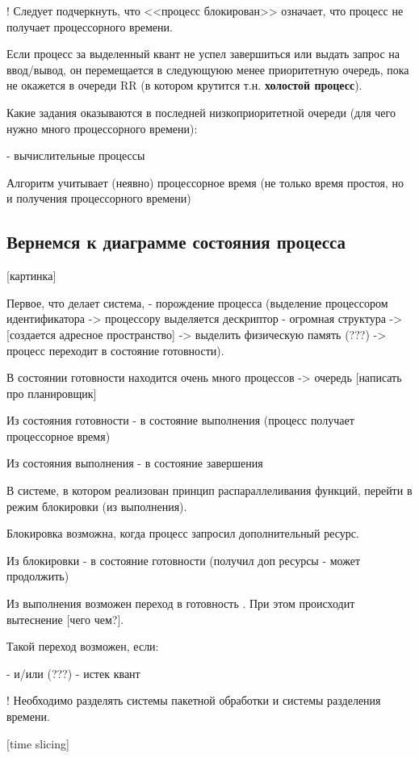 \documentclass[14pt, a4paper]{article}
\begin{document}
	! Следует подчеркнуть, что <<процесс блокирован>> означает, что процесс не получает процессорного времени.
	
	Если процесс за выделенный квант не успел завершиться или выдать запрос на ввод/вывод, он перемещается в следующуюю менее приоритетную очередь, пока не окажется в очереди RR (в котором крутится т.н. {\bf холостой процесс}).
	
	Какие задания оказываются в последней низкоприоритетной очереди (для чего нужно много процессорного времени):
	
	- вычислительные процессы
	
	Алгоритм учитывает (неявно) процессорное время (не только время простоя, но и получения процессорного времени)
	
	\subsection{Вернемся к диаграмме состояния процесса}
	
	[картинка]
	
	Первое, что делает система, - порождение процесса (выделение процессором идентификатора -> процессору выделяется дескриптор - огромная структура -> [создается адресное пространство] -> выделить физическую память (???) -> процесс переходит в состояние готовности).
	
	В состоянии готовности находится очень много процессов -> очередь [написать про планировщик]
	
	Из состояния готовности - в состояние выполнения (процесс получает процессорное время)
	
	Из состояния выполнения - в состояние завершения
	
	В системе, в котором реализован принцип распараллеливания функций, перейти в режим блокировки (из выполнения).
	
	Блокировка возможна, когда процесс запросил дополнительный ресурс.
	
	Из блокировки - в состояние готовности (получил доп ресурсы - может продолжить)
	
	Из выполнения возможен переход в готовность . При этом происходит вытеснение [чего чем?].
	
	Такой переход возможен, если:
	
	- и/или (???)
	- истек квант
	
	! Необходимо разделять системы пакетной обработки и системы разделения времени.
	
	[time slicing]
	
\end{document}
